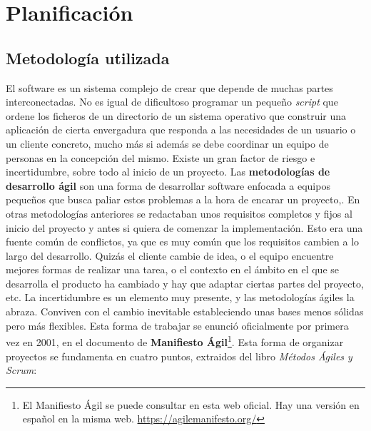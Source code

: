 \chapter{Planificación}

\section{Metodología utilizada}

El software es un sistema complejo de crear que depende de muchas partes interconectadas. No es igual de dificultoso programar un pequeño \textit{script} que ordene los ficheros de un directorio de un sistema operativo que construir una aplicación de cierta envergadura que responda a las necesidades de un usuario o un cliente concreto, mucho más si además se debe coordinar un equipo de personas en la concepción del mismo. Existe un gran factor de riesgo e incertidumbre, sobre todo al inicio de un proyecto. Las \textbf{metodologías de desarrollo ágil} son una forma de desarrollar software enfocada a equipos pequeños que busca paliar estos problemas a la hora de encarar un proyecto,. En otras metodologías anteriores se redactaban unos requisitos completos y fijos al inicio del proyecto y antes si quiera de comenzar la implementación. Esto era una fuente común de conflictos, ya que es muy común que los requisitos cambien a lo largo del desarrollo. Quizás el cliente cambie de idea, o el equipo encuentre mejores formas de realizar una tarea, o el contexto en el ámbito en el que se desarrolla el producto ha cambiado y hay que adaptar ciertas partes del proyecto, etc. La incertidumbre es un elemento muy presente, y las metodologías ágiles la abraza. Conviven con el cambio inevitable estableciendo unas bases menos sólidas pero más flexibles. Esta forma de trabajar se enunció oficialmente por primera vez en 2001, en el documento de \textbf{Manifiesto Ágil}\footnote{El Manifiesto Ágil se puede consultar en esta web oficial. Hay una versión en español en la misma web. \url{https://agilemanifesto.org/}}. Esta forma de organizar proyectos  se fundamenta en cuatro puntos, extraidos del libro \textit{Métodos Ágiles y Scrum}\cite{agilescrum}:

